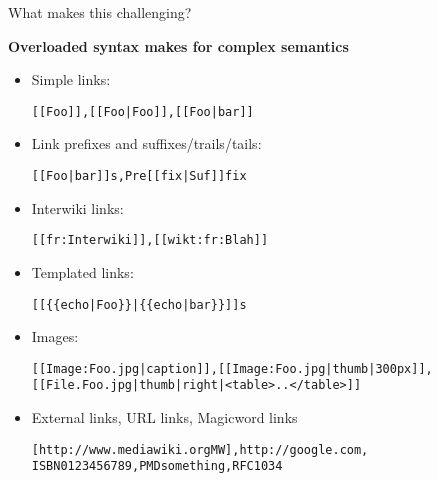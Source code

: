 \documentclass[t,xcolor=dvipsnames]{beamer}
\newenvironment{wikitext}[1][\small]%
{\begin{alltt}\bgroup\color{blue}#1}%
{\egroup\end{alltt}}
\begin{document}
\begin{frame}{What makes this challenging?}

{\bf Overloaded syntax makes for complex semantics}

\begin{itemize}
\small
\item Simple links:
  \begin{wikitext}[\small]
  [[Foo]], [[Foo|Foo]], [[Foo|bar]]
  \end{wikitext}
\item Link prefixes and suffixes/trails/tails:
  \begin{wikitext}[\small]
  [[Foo|bar]]s, Pre[[fix|Suf]]fix
  \end{wikitext}
\item Interwiki links:
  \begin{wikitext}[\small]
  [[fr:Interwiki]], [[wikt:fr:Blah]]
  \end{wikitext}
\item Templated links:
  \begin{wikitext}[\small]
  [[\{\{echo|Foo\}\}|\{\{echo|bar\}\}]]s
  \end{wikitext}
\item Images:
  \begin{wikitext}[\small]
  [[Image:Foo.jpg|caption]], [[Image:Foo.jpg|thumb|300px]],
  [[File.Foo.jpg|thumb|right|<table>..</table>]]
  \end{wikitext}
\item External links, URL links, Magicword links
  \begin{wikitext}[\small]
  [http://www.mediawiki.org MW], http://google.com, \\
  ISBN 0123456789, PMD something, RFC 1034
  \end{wikitext}
\end{itemize}

\end{frame}
\end{document}
